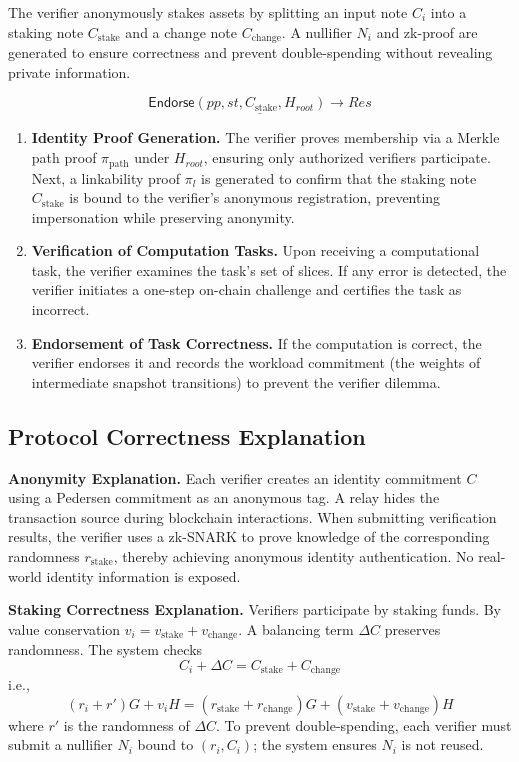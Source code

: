 \documentclass[3p]{elsarticle}
\theoremstyle{remark}
\begin{document}
The verifier anonymously stakes assets by splitting an input note $C_i$ into a staking note $C_{\text{stake}}$ and a change note $C_{\text{change}}$. A nullifier $N_i$ and zk-proof are generated to ensure correctness and prevent double-spending without revealing private information.

\[
\underline{ \mathsf{Endorse}(pp, st, C_{\text{stake}}, H_{root}) \rightarrow Res }
\]

\begin{enumerate}[label=(\arabic*)]
    \item \textbf{Identity Proof Generation.}
    The verifier proves membership via a Merkle path proof $\pi_{\text{path}}$ under $H_{root}$, ensuring only authorized verifiers participate. Next, a linkability proof $\pi_l$ is generated to confirm that the staking note $C_{\text{stake}}$ is bound to the verifier’s anonymous registration, preventing impersonation while preserving anonymity.
    \item \textbf{Verification of Computation Tasks.}
    Upon receiving a computational task, the verifier examines the task’s set of slices. If any error is detected, the verifier initiates a one-step on-chain challenge and certifies the task as incorrect.
    \item \textbf{Endorsement of Task Correctness.}
    If the computation is correct, the verifier endorses it and records the workload commitment (the weights of intermediate snapshot transitions) to prevent the verifier dilemma.
\end{enumerate}

\subsection{Protocol Correctness Explanation}

\textbf{Anonymity Explanation.}
Each verifier creates an identity commitment $C$ using a Pedersen commitment as an anonymous tag. A relay hides the transaction source during blockchain interactions. When submitting verification results, the verifier uses a zk-SNARK to prove knowledge of the corresponding randomness $r_{\text{stake}}$, thereby achieving anonymous identity authentication. No real-world identity information is exposed.

\textbf{Staking Correctness Explanation.}
Verifiers participate by staking funds. By value conservation $v_i = v_{\text{stake}} + v_{\text{change}}$. A balancing term $\Delta C$ preserves randomness. The system checks
\[
C_i + \Delta C = C_{\text{stake}} + C_{\text{change}}
\]
i.e.,
\[
(r_i + r')G + v_iH = (r_{\text{stake}} + r_{\text{change}})G + (v_{\text{stake}} + v_{\text{change}})H
\]
where $r'$ is the randomness of $\Delta C$. To prevent double-spending, each verifier must submit a nullifier $N_i$ bound to $(r_i,C_i)$; the system ensures $N_i$ is not reused.
\end{document}
